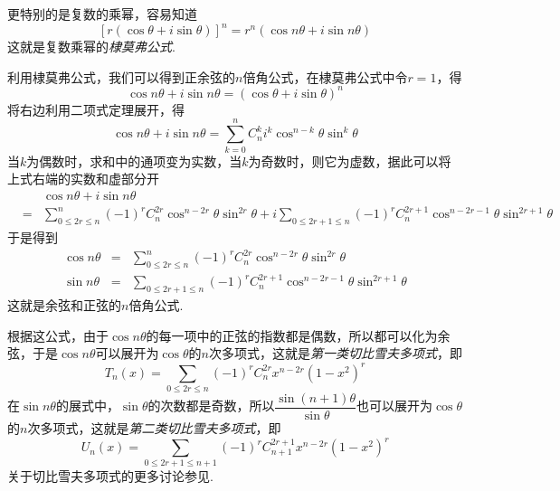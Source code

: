 更特别的是复数的乘幂，容易知道
\begin{equation}
  \label{eq:de-moivre-formula}
  [r(\cos{\theta}+i\sin{\theta})]^n = r^n(\cos{n\theta}+i\sin{n\theta})
\end{equation}
这就是复数乘幂的\emph{棣莫弗公式}.

\begin{example}
  利用棣莫弗公式，我们可以得到正余弦的$n$倍角公式，在棣莫弗公式中令$r=1$，得
  \[ \cos{n\theta}+i\sin{n\theta} = (\cos{\theta}+i\sin{\theta})^n \]
  将右边利用二项式定理展开，得
  \[ \cos{n\theta}+i\sin{n\theta} = \sum_{k=0}^n C_n^k i^k \cos^{n-k}{\theta}\sin^k{\theta} \]
  当$k$为偶数时，求和中的通项变为实数，当$k$为奇数时，则它为虚数，据此可以将上式右端的实数和虚部分开
  \begin{eqnarray*}
   && \cos{n\theta}+i\sin{n\theta}  \\
    & = & \sum_{0 \leqslant 2r \leqslant n}^n (-1)^rC_n^{2r} \cos^{n-2r}{\theta}\sin^{2r}{\theta} + i\sum_{0 \leqslant 2r+1 \leqslant n}(-1)^rC_n^{2r+1} \cos^{n-2r-1}{\theta}\sin^{2r+1}{\theta} 
  \end{eqnarray*}
  于是得到
  \begin{eqnarray}
    \label{eq:cos-sin-of-n-theta}
    \cos{n\theta} & = & \sum_{0 \leqslant 2r \leqslant n}^n (-1)^rC_n^{2r} \cos^{n-2r}{\theta}\sin^{2r}{\theta} \\
    \sin{n\theta} & = & \sum_{0 \leqslant 2r+1 \leqslant n}(-1)^rC_n^{2r+1} \cos^{n-2r-1}{\theta}\sin^{2r+1}{\theta}
  \end{eqnarray}
  这就是余弦和正弦的$n$倍角公式.

  根据这公式，由于$\cos{n\theta}$的每一项中的正弦的指数都是偶数，所以都可以化为余弦，于是$\cos{n\theta}$可以展开为$\cos{\theta}$的$n$次多项式，这就是\emph{第一类切比雪夫多项式}，即
  \[ T_n(x) = \sum_{0 \leqslant 2r\leqslant n}(-1)^rC_n^{2r}x^{n-2r}(1-x^2)^r \]
  在$\sin{n\theta}$的展式中，$\sin{\theta}$的次数都是奇数，所以$\dfrac{\sin{(n+1)\theta}}{\sin{\theta}}$也可以展开为$\cos{\theta}$的$n$次多项式，这就是\emph{第二类切比雪夫多项式}，即
  \[ U_n(x)=\sum_{0 \leqslant 2r+1 \leqslant n+1}(-1)^rC_{n+1}^{2r+1}x^{n-2r}(1-x^2)^r \]
  关于切比雪夫多项式的更多讨论参见\cite{elementary-math-notes}.
\end{example}

